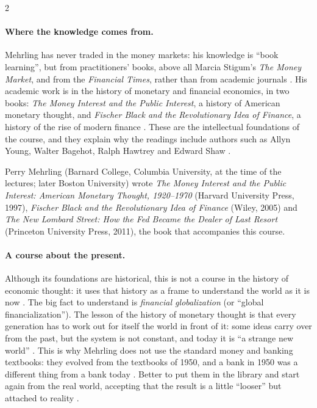 \begin{paracol}{2}
\paragraph{Where the knowledge comes from.} Mehrling has never traded in the money markets: his
knowledge is ``book learning'', but from practitioners' books, above all Marcia Stigum's
\emph{The Money Market}, and from the \emph{Financial Times}, rather than from academic journals
. His academic work is in the history of monetary and financial economics, in two
books: \emph{The Money Interest and the Public Interest}, a history of American monetary thought, and
\emph{Fischer Black and the Revolutionary Idea of Finance}, a history of the rise of modern finance
. These are the intellectual foundations of the course, and they explain why the
readings include authors such as Allyn Young, Walter Bagehot, Ralph Hawtrey and Edward Shaw
.\begin{aside}
Perry Mehrling (Barnard College, Columbia University, at the time of the lectures; later Boston
University) wrote \emph{The Money Interest and the Public Interest: American Monetary Thought,
1920--1970} (Harvard University Press, 1997), \emph{Fischer Black and the Revolutionary Idea of
Finance} (Wiley, 2005) and \emph{The New Lombard Street: How the Fed Became the Dealer of Last Resort}
(Princeton University Press, 2011), the book that accompanies this course.
\end{aside}

\paragraph{A course about the present.} Although its foundations are historical, this is not a course
in the history of economic thought: it uses that history as a frame to understand the world as it is
now . The big fact to understand is \emph{financial globalization} (or ``global
financialization''). The lesson of the history of monetary thought is that every generation has to
work out for itself the world in front of it: some ideas carry over from the past, but the system is
not constant, and today it is ``a strange new world'' . This is why Mehrling does not use
the standard money and banking textbooks: they evolved from the textbooks of 1950, and a bank in 1950
was a different thing from a bank today . Better to put them in the library and start
again from the real world, accepting that the result is a little ``looser'' but attached to reality
.


\end{paracol}
